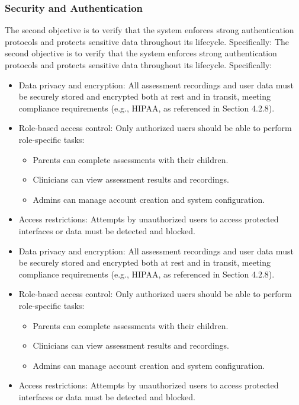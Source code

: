 \documentclass[12pt, titlepage]{article}
\begin{document}
\subsubsection{Security and Authentication}
The second objective is to verify that the system enforces strong authentication protocols and protects sensitive data throughout its lifecycle. Specifically:
The second objective is to verify that the system enforces strong authentication protocols and protects sensitive data throughout its lifecycle. Specifically:
\begin{itemize}
  \item Data privacy and encryption: All assessment recordings and user data must be securely stored and encrypted both at rest and in transit, meeting compliance requirements (e.g., HIPAA, as referenced in Section 4.2.8).
  \item Role-based access control: Only authorized users should be able to perform role-specific tasks:
    \begin{itemize}
      \item Parents can complete assessments with their children.
      \item Clinicians can view assessment results and recordings.
      \item Admins can manage account creation and system configuration.
    \end{itemize}
  \item Access restrictions: Attempts by unauthorized users to access protected interfaces or data must be detected and blocked.
  \item Data privacy and encryption: All assessment recordings and user data must be securely stored and encrypted both at rest and in transit, meeting compliance requirements (e.g., HIPAA, as referenced in Section 4.2.8).
  \item Role-based access control: Only authorized users should be able to perform role-specific tasks:
    \begin{itemize}
      \item Parents can complete assessments with their children.
      \item Clinicians can view assessment results and recordings.
      \item Admins can manage account creation and system configuration.
    \end{itemize}
  \item Access restrictions: Attempts by unauthorized users to access protected interfaces or data must be detected and blocked.
\end{itemize}
\end{document}
